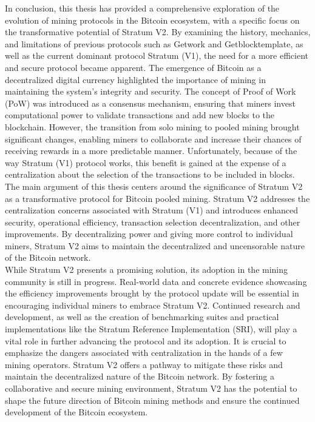 In conclusion, this thesis has provided a comprehensive exploration of the evolution of mining protocols in the Bitcoin ecosystem, with a specific focus on the transformative potential of Stratum V2. By examining the history, mechanics, and limitations of previous protocols such as Getwork and Getblocktemplate, as well as the current dominant protocol Stratum (V1), the need for a more efficient and secure protocol became apparent. The emergence of Bitcoin as a decentralized digital currency highlighted the importance of mining in maintaining the system's integrity and security. The concept of Proof of Work (PoW) was introduced as a consensus mechanism, ensuring that miners invest computational power to validate transactions and add new blocks to the blockchain. However, the transition from solo mining to pooled mining brought significant changes, enabling miners to collaborate and increase their chances of receiving rewards in a more predictable manner. Unfortunately, because of the way Stratum (V1) protocol works, this benefit is gained at the expense of a centralization about the selection of the transactions to be included in blocks.\\

\noindent The main argument of this thesis centers around the significance of Stratum V2 as a transformative protocol for Bitcoin pooled mining. Stratum V2 addresses the centralization concerns associated with Stratum (V1) and introduces enhanced security, operational efficiency, transaction selection decentralization, and other improvements. By decentralizing power and giving more control to individual miners, Stratum V2 aims to maintain the decentralized and uncensorable nature of the Bitcoin network.\\
While Stratum V2 presents a promising solution, its adoption in the mining community is still in progress. Real-world data and concrete evidence showcasing the efficiency improvements brought by the protocol update will be essential in encouraging individual miners to embrace Stratum V2. Continued research and development, as well as the creation of benchmarking suites and practical implementations like the Stratum Reference Implementation (SRI), will play a vital role in further advancing the protocol and its adoption. It is crucial to emphasize the dangers associated with centralization in the hands of a few mining operators. Stratum V2 offers a pathway to mitigate these risks and maintain the decentralized nature of the Bitcoin network. By fostering a collaborative and secure mining environment, Stratum V2 has the potential to shape the future direction of Bitcoin mining methods and ensure the continued development of the Bitcoin ecosystem.\\

